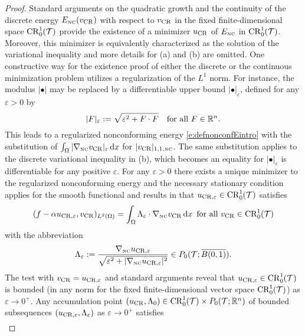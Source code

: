 \begin{proof}
Standard arguments on the quadratic growth and the continuity of the discrete 
energy $E_{\textup{\tiny NC}} (v_{\operatorname{CR}})$ with respect to 
$v_{\operatorname{CR}}$ in the fixed finite-dimensional space  ${\operatorname{CR}}^1_0(\mathcal{T})$ provide the existence 
of a minimizer $u_{\operatorname{CR}}$ of $E_{\textup{\tiny NC}}$ in
${\operatorname{CR}}^1_0(\mathcal{T})$. Moreover, this minimizer is equivalently characterized as the 
solution of the variational inequality
and more details for (a) and (b) are omitted.  One constructive  way for the 
existence proof of either the discrete or the continuous minimization problem 
utilizes a regularization of the $L^1$ norm. 
For instance, the modulus 
 $|\bullet |$ may be replaced by a differentiable upper bound 
$|\bullet|_\varepsilon$, defined for any $\varepsilon>0$ by 
\[
| F |_\varepsilon:=  \sqrt{   \varepsilon^2+ F\cdot F }\quad\text{for all }F\in\mathbb{R}^n.
\]
This leads to a regularized  nonconforming  energy \eqref{e:defnonconfEintro} with the substitution of
$\int_\Omega |\nabla_{\textup{\tiny NC}} v_{\operatorname{CR}} |_\varepsilon\,\mathrm dx$  for   $| v_{\operatorname{CR}} |_{1,1,{\textup{\tiny NC}} }$. The same substitution applies to the
discrete variational inequality in (b),  which becomes an equality 
for $| \bullet |_\varepsilon$ is differentiable for any positive $\varepsilon$. For any $\varepsilon> 0$ there 
exists a unique minimizer to the regularized nonconforming energy and the necessary stationary condition applies for the smooth functional and results in 
that $u_{\operatorname{CR},\varepsilon} \in {\operatorname{CR}}^1_0(\mathcal{T})$  satisfies
\begin{equation*}
(f-\alpha u_{\operatorname{CR},\varepsilon} , v_{\operatorname{CR}})_{L^2(\Omega)} =   \int_\Omega 
\Lambda_\varepsilon \cdot \nabla_{\textup{\tiny NC}} v_{\operatorname{CR}} \,\mathrm dx
\,\text{ for all }v_{\operatorname{CR}}\in {\operatorname{CR}}^1_0(\mathcal{T})
\end{equation*} 
with the abbreviation 
\begin{equation}\label{e:definepvarepsilon}
\Lambda_\varepsilon :=  
\frac{ \nabla_{\textup{\tiny NC}}  u_{\operatorname{CR},\varepsilon}}{ \sqrt{   \varepsilon^2+ |\nabla_{\textup{\tiny NC}}  u_{\operatorname{CR},\varepsilon}|^2 }}\in P_0(\mathcal{T}; \overline{ B(0,1)}).
\end{equation} 
The test with $v_{\operatorname{CR}}=u_{\operatorname{CR},\varepsilon} $ and standard arguments reveal that $u_{\operatorname{CR},\varepsilon} \in {\operatorname{CR}}^1_0(\mathcal{T})$ is bounded 
(in any norm for the fixed finite-dimensional vector space  ${\operatorname{CR}}^1_0(\mathcal{T})$) as $\varepsilon \to 0^+$. 
Any accumulation point $(u_{\operatorname{CR}},\Lambda_0)\in {\operatorname{CR}}^1_0(\mathcal{T})\times P_0(\mathcal{T};\mathbb{R}^n)$ of bounded subsequences 
$(u_{\operatorname{CR},\varepsilon},\Lambda_\varepsilon)$  as $\varepsilon \to 0^+$ satisfies 
\begin{align}
\label{e:limitidentityforp0}

\end{align}
\end{proof}
